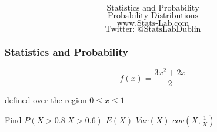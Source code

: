 \documentclass{beamer}
\begin{document}
\begin{frame}
\Huge
\[ \mbox{Statistics and Probability} \]
\LARGE
\[ \mbox{Probability Distributions} \]
\bigskip
\Large
\[ \mbox{www.Stats-Lab.com} \]
\[ \mbox{Twitter: @StatsLabDublin} \]
\bigskip

\end{frame}


\begin{frame}
\frametitle{Statistics and Probability}
\Large
\[f(x) = \frac{3x^2 + 2x}{2} \]

defined over the region $0 \leq x \leq 1$

Find $P(X >0.8 | X >0.6)$
$E(X)$
$Var(X)$
$cov(X, \frac{1}{X})$

\end{frame}
\end{document}
